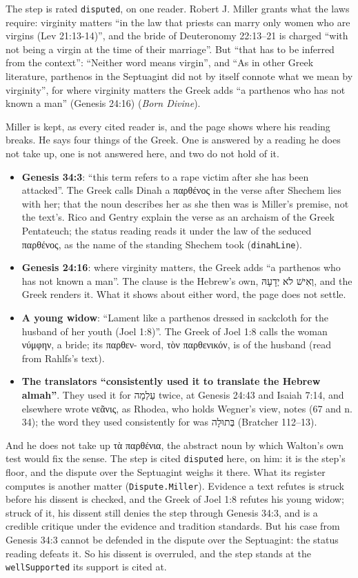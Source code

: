 \documentclass[11pt]{article}
\begin{document}
The step is rated \texttt{disputed}, on one reader. Robert J. Miller grants what the laws require: virginity matters “in the law that priests can marry only women who are virgins (Lev 21:13-14)”, and the bride of Deuteronomy 22:13–21 is charged “with not being a virgin at the time of their marriage”. But “that has to be inferred from the context”: “Neither word means virgin”, and “As in other Greek literature, parthenos in the Septuagint did not by itself connote what we mean by virginity”, for where virginity matters the Greek adds “a parthenos who has not known a man” (Genesis 24:16) (\emph{Born Divine}).

Miller is kept, as every cited reader is, and the page shows where his reading breaks. He says four things of the Greek. One is answered by a reading he does not take up, one is not answered here, and two do not hold of it.

\begin{itemize}
  \item \textbf{Genesis 34:3}: “this term refers to a rape victim after she has been attacked”. The Greek calls Dinah a παρθένος in the verse after Shechem lies with her; that the noun describes her as she then was is Miller’s premise, not the text’s. Rico and Gentry explain the verse as an archaism of the Greek Pentateuch; the status reading reads it under the law of the seduced παρθένος, as the name of the standing Shechem took (\texttt{dinah\allowbreak{}Line}).
  \item \textbf{Genesis 24:16}: where virginity matters, the Greek adds “a parthenos who has not known a man”. The clause is the Hebrew’s own, וְאִישׁ לֹא יְדָעָהּ, and the Greek renders it. What it shows about either word, the page does not settle.
  \item \textbf{A young widow}: “Lament like a parthenos dressed in sackcloth for the husband of her youth (Joel 1:8)”. The Greek of Joel 1:8 calls the woman νύμφην, a bride; its παρθεν- word, τὸν παρθενικόν, is of the husband (read from Rahlfs’s text).
  \item \textbf{The translators “consistently used it to translate the Hebrew almah”}. They used it for עַלְמָה twice, at Genesis 24:43 and Isaiah 7:14, and elsewhere wrote νεᾶνις, as Rhodea, who holds Wegner’s view, notes (67 and n. 34); the word they used consistently for was בְּתוּלָה (Bratcher 112–13).
\end{itemize}
And he does not take up τὰ παρθένια, the abstract noun by which Walton’s own test would fix the sense. The step is cited \texttt{disputed} here, on him: it is the step’s floor, and the dispute over the Septuagint weighs it there. What its register computes is another matter (\texttt{Dispute.Miller}). Evidence a text refutes is struck before his dissent is checked, and the Greek of Joel 1:8 refutes his young widow; struck of it, his dissent still denies the step through Genesis 34:3, and is a credible critique under the evidence and tradition standards. But his case from Genesis 34:3 cannot be defended in the dispute over the Septuagint: the status reading defeats it. So his dissent is overruled, and the step stands at the \texttt{well\allowbreak{}Supported} its support is cited at.
\end{document}
